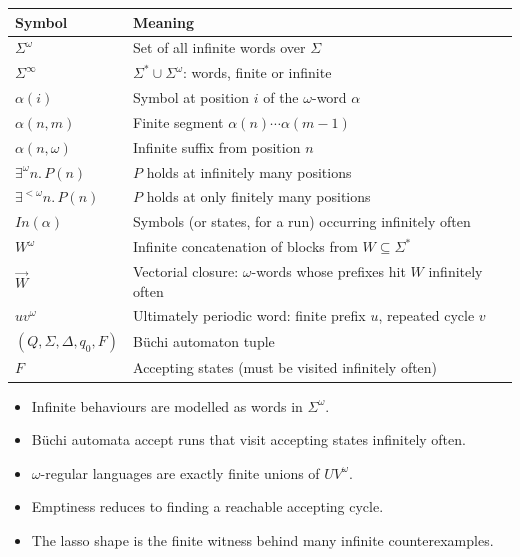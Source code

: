 \begin{center}
\begin{tabular}{@{}l l@{}}
\toprule
\textbf{Symbol} & \textbf{Meaning} \\
\midrule
$\Sigma^\omega$       & Set of all infinite words over $\Sigma$ \\
$\Sigma^\infty$       & $\Sigma^*\cup\Sigma^\omega$: words, finite or infinite \\
$\alpha(i)$           & Symbol at position $i$ of the $\omega$-word $\alpha$ \\
$\alpha(n,m)$         & Finite segment $\alpha(n)\cdots\alpha(m-1)$ \\
$\alpha(n,\omega)$    & Infinite suffix from position $n$ \\
$\exists^\omega n.\,P(n)$    & $P$ holds at infinitely many positions \\
$\exists^{<\omega} n.\,P(n)$ & $P$ holds at only finitely many positions \\
$In(\alpha)$          & Symbols (or states, for a run) occurring infinitely often \\
$W^\omega$            & Infinite concatenation of blocks from $W\subseteq\Sigma^*$ \\
$\overrightarrow{W}$  & Vectorial closure: $\omega$-words whose prefixes hit $W$ infinitely often \\
$uv^\omega$           & Ultimately periodic word: finite prefix $u$, repeated cycle $v$ \\
$(Q,\Sigma,\Delta,q_0,F)$ & B\"uchi automaton tuple \\
$F$                   & Accepting states (must be visited infinitely often) \\
\bottomrule
\end{tabular}
\end{center}

\begin{summarybox}
\begin{itemize}[nosep]
  \item Infinite behaviours are modelled as words in $\Sigma^\omega$.
  \item B\"uchi automata accept runs that visit accepting states infinitely often.
  \item $\omega$-regular languages are exactly finite unions of $UV^\omega$.
  \item Emptiness reduces to finding a reachable accepting cycle.
  \item The lasso shape is the finite witness behind many infinite counterexamples.
\end{itemize}
\end{summarybox}

